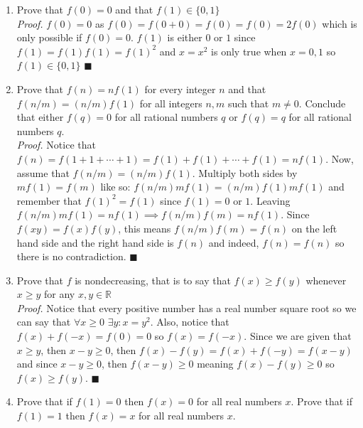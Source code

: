 \documentclass[14pt]{extarticle}
\begin{document}
\begin{enumerate}[label=(\alph*)]
    \item Prove that $f(0) = 0$ and that $f(1) \in \{0, 1\}$\\

        \textit{Proof.} $f(0) = 0$ as $f(0) = f(0 + 0) = f(0) = f(0) = 2f(0)$ which is only possible if $f(0) = 0$. $f(1)$ is
        either $0$ or $1$ since $f(1) = f(1)f(1) = f(1)^2$ and $x = x^2$ is only true when $x = 0, 1$ so $f(1)\in \{0, 1\}$
        \hfill
        $\blacksquare$

    \pagebreak

\item Prove that $f(n) = nf(1)$ for every integer $n$ and that $f(n/m) = (n/m)f(1)$ for all integers $n,m$ such that $m\neq 0$. Conclude
    that either $f(q) = 0$ for all rational numbers $q$ or $f(q) = q$ for all rational numbers $q$.\\

        \textit{Proof.} Notice that $f(n) = f(1 + 1 + \cdots + 1) = f(1) + f(1) + \cdots + f(1) = nf(1)$. Now, assume that
        $f(n/m) = (n/m)f(1)$. Multiply both sides by $mf(1) = f(m)$ like so: $f(n/m)mf(1) = (n/m)f(1)mf(1)$ and remember that
        $f(1)^2 = f(1)$ since $f(1) = 0$ or $1$. Leaving $f(n/m)mf(1) = nf(1) \implies f(n/m)f(m) = nf(1)$. Since
        $f(xy) = f(x)f(y)$, this means $f(n/m)f(m) = f(n)$ on the left hand side and the right hand side is $f(n)$ and indeed,
        $f(n) = f(n)$ so there is no contradiction.
        \hfill
        $\blacksquare$

    \item Prove that $f$ is nondecreasing, that is to say that $f(x) \geq f(y)$ whenever $x \geq y$ for any $x,y\in \mathbb{R}$\\

        \textit{Proof.} Notice that every positive number has a real number square root so we can say that $\forall x \geq 0$ $\exists y:
        x = y^2$. Also, notice that $f(x) + f(-x) = f(0) = 0$ so $f(x) = f(-x)$. Since we are given that $x\geq y$, then $x-y\geq 0$,
        then $f(x) - f(y) = f(x) + f(-y) = f(x - y)$ and since $x - y\geq 0$, then $f(x - y) \geq 0$ meaning $f(x) - f(y) \geq 0$
        so $f(x) \geq f(y)$.
        \hfill
        $\blacksquare$

    \item Prove that if $f(1) = 0$ then $f(x) = 0$ for all real numbers $x$. Prove that if $f(1) = 1$ then $f(x) = x$ for all 
        real numbers $x$.\\


\end{enumerate}
\end{document}
